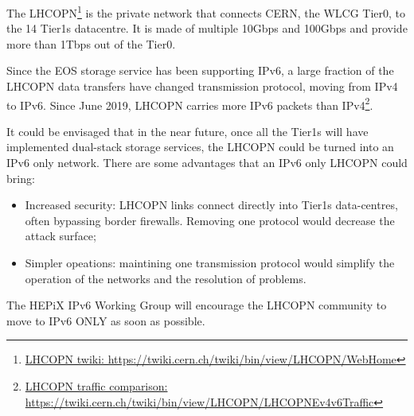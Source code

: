 
The LHCOPN\footnote{\href{https://twiki.cern.ch/twiki/bin/view/LHCOPN/WebHome}{LHCOPN twiki: https://twiki.cern.ch/twiki/bin/view/LHCOPN/WebHome}} is the private network that connects CERN, the WLCG Tier0, to the 14 Tier1s datacentre. It is made of multiple 10Gbps and 100Gbps and provide more than 1Tbps out of the Tier0.

Since the EOS storage service has been supporting IPv6, a large fraction of the LHCOPN data transfers have changed transmission protocol, moving from IPv4 to IPv6. Since June 2019, LHCOPN carries more IPv6 packets than IPv4\footnote{\href{https://twiki.cern.ch/twiki/bin/view/LHCOPN/LHCOPNEv4v6Traffic}{LHCOPN traffic comparison: https://twiki.cern.ch/twiki/bin/view/LHCOPN/LHCOPNEv4v6Traffic}}. 

It could be envisaged that in the near future, once all the Tier1s will have implemented dual-stack storage services, the LHCOPN could be turned into an IPv6 only network. There are some advantages that an IPv6 only LHCOPN could bring:
\begin{itemize}
  \item Increased security: LHCOPN links connect directly into Tier1s data-centres, often bypassing border firewalls. Removing one protocol would decrease the attack surface;
  \item Simpler opeations: maintining one transmission protocol would simplify the operation of the networks and the resolution of problems.
\end{itemize}

The HEPiX IPv6 Working Group will encourage the LHCOPN community to move to IPv6 ONLY as soon as possible.




